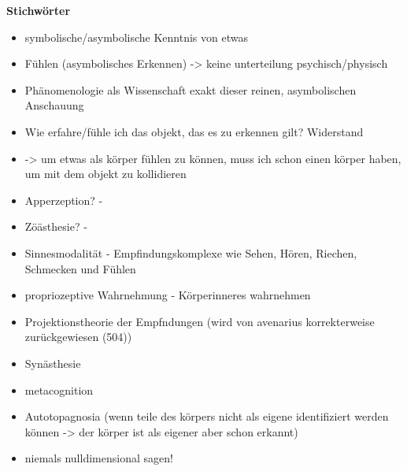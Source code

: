 \documentclass[a4paper, 12pt]{article}
\begin{document}
\begin{onehalfspace}
\vspace{5mm}
\noindent\textbf{Stichwörter}
\begin{itemize}
  \item symbolische/asymbolische Kenntnis von etwas
  \item Fühlen (asymbolisches Erkennen) -> keine unterteilung psychisch/physisch
  \item Phänomenologie als Wissenschaft exakt dieser reinen, asymbolischen Anschauung
  \item Wie erfahre/fühle ich das objekt, das es zu erkennen gilt? Widerstand
  \item -> um etwas als körper fühlen zu können, muss ich schon einen körper haben, um mit dem objekt zu kollidieren 
  \item Apperzeption? - 
  \item Zöästhesie? - 
  \item Sinnesmodalität - Empfindungskomplexe wie Sehen, Hören, Riechen, Schmecken und Fühlen
  \item propriozeptive Wahrnehmung - Körperinneres wahrnehmen
  \item Projektionstheorie der Empfndungen (wird von avenarius korrekterweise zurückgewiesen (504))
  \item Synästhesie
  \item metacognition
  \item Autotopagnosia (wenn teile des körpers nicht als eigene identifiziert werden können -> der körper ist als eigener aber schon erkannt)
  \item niemals nulldimensional sagen!
\end{itemize}








\end{onehalfspace}
\end{document}
